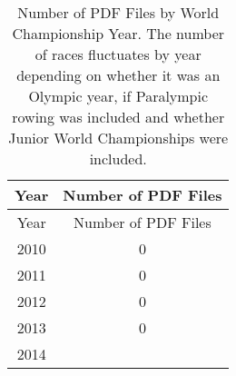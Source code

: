 \documentclass[11pt,]{article}
\begin{document}
\begin{longtable}[]{@{}cc@{}}
\caption{Number of PDF Files by World Championship Year. The number of
races fluctuates by year depending on whether it was an Olympic year, if
Paralympic rowing was included and whether Junior World Championships
were included.}\tabularnewline
\toprule
\begin{minipage}[b]{0.09\columnwidth}\centering\strut
Year\strut
\end{minipage} & \begin{minipage}[b]{0.27\columnwidth}\centering\strut
Number of PDF Files\strut
\end{minipage}\tabularnewline
\midrule
\endfirsthead
\toprule
\begin{minipage}[b]{0.09\columnwidth}\centering\strut
Year\strut
\end{minipage} & \begin{minipage}[b]{0.27\columnwidth}\centering\strut
Number of PDF Files\strut
\end{minipage}\tabularnewline
\midrule
\endhead
\begin{minipage}[t]{0.09\columnwidth}\centering\strut
2010\strut
\end{minipage} & \begin{minipage}[t]{0.27\columnwidth}\centering\strut
0\strut
\end{minipage}\tabularnewline
\begin{minipage}[t]{0.09\columnwidth}\centering\strut
2011\strut
\end{minipage} & \begin{minipage}[t]{0.27\columnwidth}\centering\strut
0\strut
\end{minipage}\tabularnewline
\begin{minipage}[t]{0.09\columnwidth}\centering\strut
2012\strut
\end{minipage} & \begin{minipage}[t]{0.27\columnwidth}\centering\strut
0\strut
\end{minipage}\tabularnewline
\begin{minipage}[t]{0.09\columnwidth}\centering\strut
2013\strut
\end{minipage} & \begin{minipage}[t]{0.27\columnwidth}\centering\strut
0\strut
\end{minipage}\tabularnewline
\begin{minipage}[t]{0.09\columnwidth}\centering\strut
2014\strut
\end{minipage} & \begin{minipage}[t]{0.27\columnwidth}\centering\strut

\end{minipage}
\end{longtable}
\end{document}
